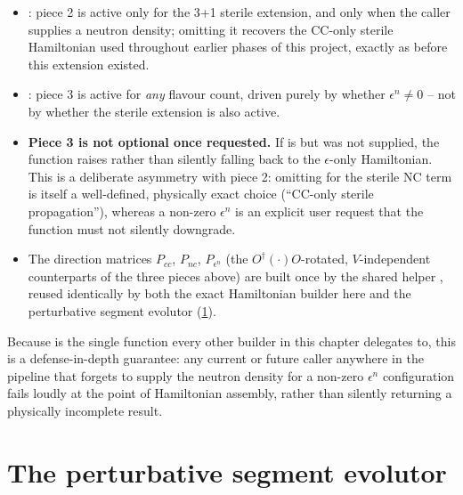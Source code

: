 \begin{implbox}
\begin{itemize}
  \item {}:
    piece 2 is active only for the 3+1 sterile extension, and only when the
    caller supplies a neutron density; omitting it recovers the CC-only
    sterile Hamiltonian used throughout earlier phases of this project,
    exactly as before this extension existed.
  \item {}: piece 3 is active for
    \emph{any} flavour count, driven purely by whether $\epsilon^n\neq0$ --
    not by whether the sterile extension is also active.
  \item \textbf{Piece 3 is not optional once requested.} If
     is  but  was not
    supplied, the function raises  rather than silently
    falling back to the $\epsilon$-only Hamiltonian. This is a deliberate
    asymmetry with piece 2: omitting  for the sterile
    NC term is itself a well-defined, physically exact choice (``CC-only
    sterile propagation''), whereas a non-zero $\epsilon^n$ is an explicit
    user request that the function must not silently downgrade.
  \item The direction matrices $P_{cc}$, $P_{nc}$, $P_{\epsilon^n}$ (the
    $O^\dagger(\cdot)O$-rotated, $V$-independent counterparts of the three
    pieces above) are built once by the shared helper
    , reused identically by both the
    exact Hamiltonian builder here and the perturbative segment evolutor
    (\cref{sec:impl-perturbative}).
\end{itemize}
\end{implbox}

\begin{notebox}
Because  is the single function every
other builder in this chapter delegates to, this  is a
defense-in-depth guarantee: any current or future caller anywhere in the
pipeline that forgets to supply the neutron density for a non-zero
$\epsilon^n$ configuration fails loudly at the point of Hamiltonian
assembly, rather than silently returning a physically incomplete result.
\end{notebox}

\section{The perturbative segment evolutor}
\label{sec:impl-perturbative}

